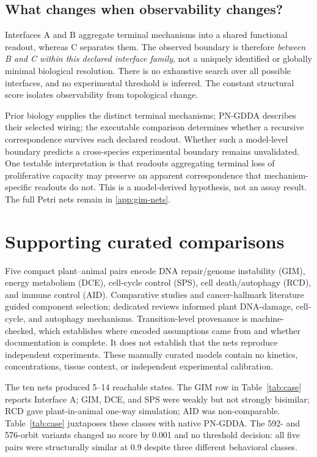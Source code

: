\documentclass{ws-jbcb}
\numberwithin{equation}{section}
\begin{document}
\subsection{What changes when observability changes?}
Interfaces A and B aggregate terminal mechanisms into a shared functional
readout, whereas C separates them. The observed boundary is therefore
\emph{between B and C within this declared interface family}, not a uniquely
identified or globally minimal biological resolution. There is no exhaustive
search over all possible interfaces, and no experimental threshold is inferred.
The constant structural score isolates observability from topological change.

Prior biology supplies the distinct terminal mechanisms; PN-GDDA describes
their selected wiring; the executable comparison determines whether a
recursive correspondence survives each declared readout. Whether such a
model-level boundary predicts a cross-species experimental boundary remains
unvalidated. One testable interpretation is that readouts aggregating terminal
loss of proliferative capacity may preserve an apparent correspondence that
mechanism-specific readouts do not. This is a model-derived hypothesis, not an
assay result. The full Petri nets remain in \ref{app:gim-nets}.

\section{Supporting curated comparisons}\label{sec:case-method}

Five compact plant--animal pairs encode DNA repair/genome instability (GIM), energy
metabolism (DCE), cell-cycle control (SPS), cell death/autophagy (RCD), and
immune control (AID). Comparative studies and cancer-hallmark literature guided
component selection; dedicated reviews informed plant DNA-damage, cell-cycle,
and autophagy mechanisms.\cite{Quimbaya2012,ClavijoBuritica2023,Hanahan2022,
Yoshiyama2013} Transition-level provenance is machine-checked, which establishes
where encoded assumptions came from and whether documentation is complete. It
does not establish that the nets reproduce independent experiments. These
manually curated models contain no kinetics, concentrations, tissue context, or
independent experimental calibration.

The ten nets produced 5--14 reachable states. The GIM row in
Table~\ref{tab:case} reports Interface A; GIM, DCE, and SPS were weakly but
not strongly bisimilar; RCD gave plant-in-animal one-way simulation; AID was
non-comparable. Table~\ref{tab:case} juxtaposes these classes with native
PN-GDDA. The 592- and 576-orbit variants changed no score by 0.001 and no
threshold decision: all five pairs were structurally similar at 0.9 despite
three different behavioral classes.
\end{document}
